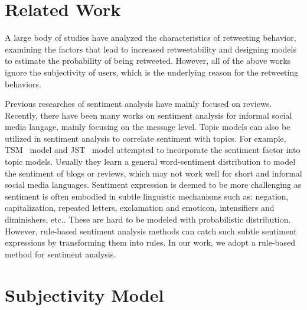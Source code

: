 \documentclass[letterpaper]{article}
\begin{document}
\section{Related Work}
\label{relatedwork}
   
A large body of studies have analyzed the characteristics of retweeting behavior\cite{Bian2014,Luo:2013RMF}, examining the factors that lead to increased retweetability\cite{suh2010want,comarela2012understanding} and designing models to estimate the probability of being retweeted\cite{jenders2013analyzing,pfitzner2012emotional}. However, all of the above works ignore the subjectivity of users, which is the underlying reason for the retweeting behaviors. 

Previous researches of sentiment analysis have mainly focused on reviews\cite{liu2012sentiment}. 
Recently, there have been many works on sentiment analysis for informal social media langage, mainly focusing on the message level\cite{jiang2011target,tan2011user,Guerra2014}. Topic models can also be utilized in sentiment analysis to correlate sentiment with topics. For example, TSM~\cite{mei2007topic} model and JST~\cite{lin2009joint} model attempted to incorporate the sentiment factor into topic models. Usually they learn a general word-sentiment distribution to model the sentiment of blogs or reviews, which may not work well for short and informal social media languages. Sentiment expression is deemed to be more challenging as sentiment is often embodied in subtle linguistic mechanisms such as: negation, capitalization, repeated letters, exclamation and emoticon, intensifiers and diminishers, etc.\cite{brody2011col}. These are hard to be modeled with probabilistic distribution. However, rule-based sentiment analysis methods can catch such subtle sentiment expressions by transforming them into rules\cite{thelwall2010sentiment}. In our work, we adopt a rule-based method for sentiment analysis.

\section{Subjectivity Model}
\label{subjectivemodel}
\end{document}
